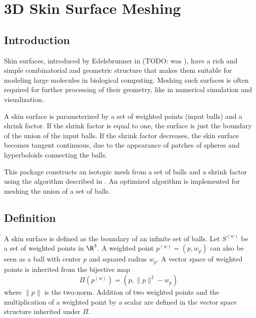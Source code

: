 
\chapter{3D Skin Surface Meshing}
\label{chapterSkinSurface}

\minitoc

\section{Introduction}
\label{sectionSkinSurfaceIntro}

Skin surfaces, introduced by Edelsbrunner in \cite{cgal:e-dssd-99} (TODO: was
\cite{e-dssd-98}), have a rich and simple combinatorial and geometric
structure that makes them suitable for modeling large molecules in
biological computing.  Meshing such surfaces is often required for
further processing of their geometry, like in numerical simulation and
visualization.

A skin surface is parameterized by a set of weighted points (input
balls) and a shrink factor. If the shrink factor is equal to one, the
surface is just the boundary of the union of the input balls.  If the
shrink factor decreases, the skin surface becomes tangent continuous,
due to the appearance of patches of spheres and hyperboloids
connecting the balls.

This package constructs an isotopic mesh from a set of balls and a
shrink factor using the algorithm described in
\cite{cgal:kv-mssct-05}. An optimized algorithm is implemented for
meshing the union of a set of balls.

\section{Definition}
A skin surface is defined as the boundary of an infinite set of balls.
Let ${S}^{(w)}$ be a set of weighted points in $\R^3$. A weighted
point ${p}^{(w)}=(p,w_p)$ can also be seen as a ball with center $p$
and squared radius $w_p$. A vector space of weighted points is
inherited from the bijective map
\[\Pi({p}^{(w)}) = ({p, \|{p}\|^2-w_p})\]
where $\|{p}\|$ is the two-norm. Addition of two weighted points and
the multiplication of a weighted point by a scalar are defined in the
vector space structure inherited under $\Pi$.

